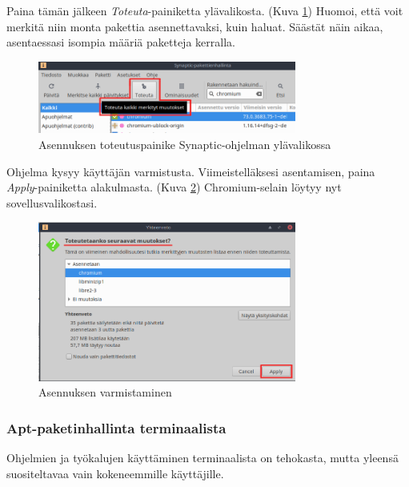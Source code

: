\documentclass[a4paper, 12pt, finnish]{article}
\begin{document}
Paina tämän jälkeen \textit{Toteuta}-painiketta ylävalikosta. (Kuva \ref{fig:toteuta}) Huomoi, että voit merkitä niin monta pakettia asennettavaksi, kuin haluat. Säästät näin aikaa, asentaessasi isompia määriä paketteja kerralla.

\begin{figure}[htpb]
    \begin{center}
        \includegraphics[width=0.756\textwidth]{ymparisto/syn_toteuta}
        \caption{Asennuksen toteutuspainike Synaptic-ohjelman ylävalikossa}
        \label{fig:toteuta}
    \end{center}
\end{figure}

Ohjelma kysyy käyttäjän varmistusta. Viimeistelläksesi asentamisen, paina \textit{Apply}-painiketta alakulmasta. (Kuva \ref{fig:toteuta2}) Chromium-selain löytyy nyt sovellusvalikostasi.

\begin{figure}[htpb]
    \begin{center}
        \includegraphics[width=0.756\textwidth]{ymparisto/syn_toteuta2}
        \caption{Asennuksen varmistaminen}
        \label{fig:toteuta2}
    \end{center}
\end{figure}

\clearpage

\subsubsection{Apt-paketinhallinta terminaalista}
Ohjelmien ja työkalujen käyttäminen terminaalista on tehokasta, mutta yleensä suositeltavaa vain kokeneemmille käyttäjille.
\end{document}
